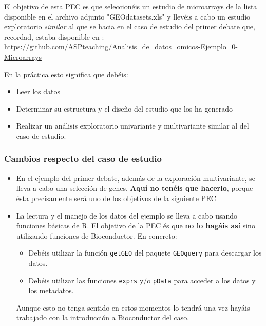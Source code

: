 \documentclass[
  letterpaper,
  DIV=11,
  numbers=noendperiod]{scrartcl}
\begin{document}
El objetivo de esta PEC es que seleccionéis un estudio de microarrays de
la lista disponible en el archivo adjunto "GEOdatasets.xls" y llevéis a
cabo un estudio exploratorio \emph{similar} al que se hacia en el caso
de estudio del primer debate que, recordad, estaba disponible en :
\url{https://github.com/ASPteaching/Analisis_de_datos_omicos-Ejemplo_0-Microarrays}

En la práctica esto significa que debéis:

\begin{itemize}
\item
  Leer los datos
\item
  Determinar su estructura y el diseño del estudio que los ha generado
\item
  Realizar un análisis exploratorio univariante y multivariante similar
  al del caso de estudio.
\end{itemize}

\hypertarget{cambios-respecto-del-caso-de-estudio}{%
\subsubsection{Cambios respecto del caso de
estudio}\label{cambios-respecto-del-caso-de-estudio}}

\begin{itemize}
\item
  En el ejemplo del primer debate, además de la exploración
  multivariante, se lleva a cabo una selección de genes. \textbf{Aquí no
  tenéis que hacerlo}, porque ésta precisamente será uno de los
  objetivos de la siguiente PEC
\item
  La lectura y el manejo de los datos del ejemplo se lleva a cabo usando
  funciones básicas de R. El objetivo de la PEC és que \textbf{no lo
  hagáis así} sino utilizando funciones de Bioconductor. En concreto:

  \begin{itemize}
  \item
    Debéis utilizar la función \texttt{getGEO} del paquete
    \texttt{GEOquery} para descargar los datos.
  \item
    Debéis utilizar las funciones \texttt{exprs} y/o \texttt{pData} para
    acceder a los datos y los metadatos.
  \end{itemize}

  Aunque esto no tenga sentido en estos momentos lo tendrá una vez
  hayáis trabajado con la introducción a Bioconductor del caso.
\end{itemize}
\end{document}
